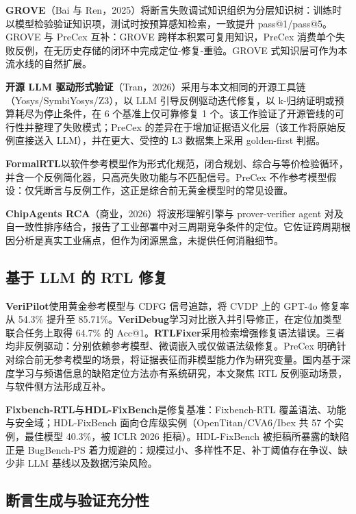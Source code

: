\documentclass[journal]{IEEEtran}
\begin{document}
\textbf{GROVE}（Bai 与 Ren，2025）\cite{grove}将断言失败调试知识组织为分层知识树：训练时以模型检验验证知识项，测试时按预算感知检索，一致提升 pass@1/pass@5。GROVE 与 PreCex 互补：GROVE 跨样本积累可复用知识，PreCex 消费单个失败反例，在无历史存储的闭环中完成定位-修复-重验。GROVE 式知识层可作为本流水线的自然扩展。

\textbf{开源 LLM 驱动形式验证}（Tran，2026）\cite{openllmformal}采用与本文相同的开源工具链（Yosys/SymbiYosys/Z3），以 LLM 引导反例驱动迭代修复，以 k-归纳证明或预算耗尽为停止条件，在 6 个基准上仅可靠修复 1 个。该工作验证了开源管线的可行性并整理了失败模式；PreCex 的差异在于增加证据语义化层（该工作将原始反例直接送入 LLM），并在更大、受控的 L3 数据集上采用 golden-first 判据。

\textbf{FormalRTL}\cite{formalrtl}以软件参考模型作为形式化规范，闭合规划、综合与等价检验循环，并含一个反例简化器，只高亮失败功能与不匹配信号。PreCex 不作参考模型假设：仅凭断言与反例工作，这正是综合前无黄金模型时的常见设置。

\textbf{ChipAgents RCA}（商业，2026）\cite{chipagents}将波形理解引擎与 prover-verifier agent 对及自一致性排序结合，报告了工业部署中对三周期竞争条件的定位。它佐证跨周期根因分析是真实工业痛点，但作为闭源黑盒，未提供任何消融细节。

\subsection{基于 LLM 的 RTL 修复}

\textbf{VeriPilot}\cite{veripilot}使用黄金参考模型与 CDFG 信号追踪，将 CVDP 上的 GPT-4o 修复率从 54.3\% 提升至 85.71\%。\textbf{VeriDebug}\cite{veridebug}学习对比嵌入并引导修正，在定位加类型联合任务上取得 64.7\% 的 Acc@1。\textbf{RTLFixer}\cite{rtlfixer}采用检索增强修复语法错误。三者均非反例驱动：分别依赖参考模型、微调嵌入或仅做语法级修复。PreCex 明确针对综合前无参考模型的场景，将证据表征而非模型能力作为研究变量。国内基于深度学习与频谱信息的缺陷定位方法亦有系统研究\cite{zh5}，本文聚焦 RTL 反例驱动场景，与软件侧方法形成互补。

\textbf{Fixbench-RTL}\cite{fixbench}与\textbf{HDL-FixBench}\cite{hdlfixbench}是修复基准：Fixbench-RTL 覆盖语法、功能与安全域；HDL-FixBench 面向仓库级实例（OpenTitan/CVA6/Ibex 共 57 个实例，最佳模型 40.3\%，被 ICLR 2026 拒稿）。HDL-FixBench 被拒稿所暴露的缺陷正是 BugBench-PS 着力规避的：规模过小、多样性不足、补丁阈值存在争议、缺少非 LLM 基线以及数据污染风险。

\subsection{断言生成与验证充分性}
\end{document}
